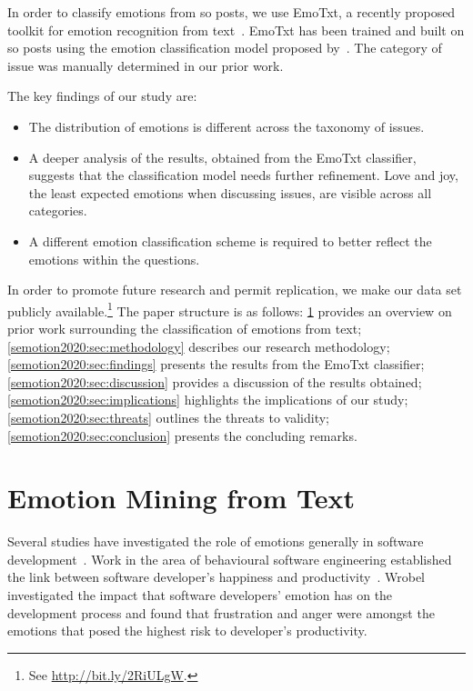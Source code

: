 In order to classify emotions from \gls{so} posts, we use EmoTxt, a recently proposed toolkit for emotion recognition from text~\citep{novielli2018, calefato2017, calefato2018}. EmoTxt has been trained and built on \gls{so} posts using the emotion classification model proposed by~\citet{shaver1987}. The category of issue was manually determined in our prior work. 


The key findings of our study are:

\begin{itemize}
    \item The distribution of emotions is different across the taxonomy of issues.
    \item A deeper analysis of the results, obtained from the EmoTxt classifier, suggests that the classification model needs further refinement. Love and joy, the least expected emotions when discussing  issues, are visible across all categories.
    \item A different emotion classification scheme is required to better reflect the emotions within the questions.
\end{itemize}

In order to promote future research and permit replication, we make our data set publicly available.\footnote{See \url{http://bit.ly/2RiULgW}.} The paper structure is as follows: \cref{semotion2020:sec:EM} provides an overview on prior work surrounding the classification of emotions from text; \cref{semotion2020:sec:methodology} describes our research methodology;  \cref{semotion2020:sec:findings} presents the results from the EmoTxt classifier;  \cref{semotion2020:sec:discussion} provides a discussion of the results obtained; \cref{semotion2020:sec:implications} highlights the implications of our study; \cref{semotion2020:sec:threats} outlines the threats to validity; \cref{semotion2020:sec:conclusion} presents the concluding remarks.  


 
\section{Emotion Mining from Text}\label{semotion2020:sec:EM}

Several studies have investigated the role of emotions generally in software development~\citep{wrobel2013, Shaw:2003aa, ortu2016, gachechiladze2017}. Work in the area of behavioural software engineering established the link between software developer's happiness and productivity~\citep{Graziontin:2017}. Wrobel~\citep{wrobel2013} investigated the impact that software developers' emotion has on the development process and found that frustration and anger were amongst the emotions that posed the highest risk to developer's productivity.    

